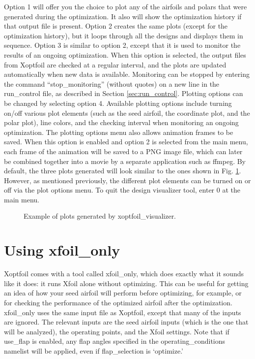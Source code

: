 \documentclass[11pt]{article}
\begin{document}
Option 1 will offer you the choice to plot any of the airfoils and polars that were
generated during the optimization. It also will show the optimization history if that
output file is present. Option 2 creates the same plots (except for the optimization 
history), but it loops through all the designs and displays them in sequence. Option 3 is
similar to option 2, except that it is used to monitor the results of an ongoing
optimization. When this option is selected, the output files from Xoptfoil are checked at
a regular interval, and the plots are updated automatically when new data is available. 
Monitoring can be stopped by entering the command ``stop\_monitoring'' (without quotes) on
a new line in the run\_control file, as described in Section \ref{sec:run_control}.
Plotting options can be 
changed by selecting option 4.  Available plotting options include turning on/off various
plot elements (such as the seed airfoil, the coordinate  plot, and the polar plot), line 
colors, and the checking interval when monitoring an ongoing optimization.  The plotting 
options menu also allows animation frames to be saved. When this option is enabled and 
option 2 is selected from the main menu, each frame of the animation will be saved to a
PNG image file, which can later be combined together into a movie by a separate
application such as ffmpeg.  By default, the three plots generated  will look similar to 
the ones shown in Fig. \ref{fig:visualizer_plot}.  However, as mentioned
previously, the different plot elements can be turned on or off via the plot options menu.
To quit the design visualizer tool, enter 0 at the main menu.

\begin{figure}
\centering

\caption{Example of plots generated by xoptfoil\_visualizer.}
\label{fig:visualizer_plot}
\end{figure}

\section{Using xfoil\_only}

Xoptfoil comes with a tool called xfoil\_only, which does exactly what it sounds like it
does: it runs Xfoil alone without optimizing. This can be useful for getting an idea of
how your seed airfoil will perform before optimizing, for example, or for checking the
performance of the optimized airfoil after the optimization. xfoil\_only uses the same
input file as Xoptfoil, except that many of the inputs are ignored. The relevant
inputs are the seed airfoil inputs (which is the one that will be analyzed), the operating
points, and the Xfoil settings. Note that if use\_flap is enabled, any flap angles 
specified in the operating\_conditions namelist will be applied, even if flap\_selection
is `optimize.' 
\end{document}
